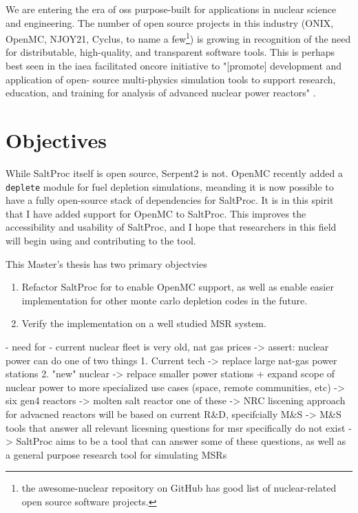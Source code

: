     We are entering the era of \Gls{oss} purpose-built for applications in nuclear science and engineering. The number of open source projects in this industry (ONIX\cite{de_troullioud_de_lanversin_onix_2021}, OpenMC, NJOY21\cite{noauthor_njoy21_2022}, Cyclus\cite{noauthor_cyclus_2022}, to name a few\footnote{the awesome-nuclear repository on GitHub \cite{romano_awesome_2022} has good list of nuclear-related open source software projects.}) is growing in recognition of the need for distributable, high-quality, and transparent software tools. This is perhaps best seen in the \Gls{iaea} facilitated \Gls{oncore} initiative \cite{fiorina_initiative_2021} to "[promote] development and application of open- source multi-physics simulation tools to support research, education, and training for analysis of advanced nuclear power reactors"  \cite{iaea_open-source_2022}. 


\section{Objectives}%
\label{sec:objectives}

While SaltProc itself is open source, Serpent2 is not. OpenMC recently added a \verb.deplete. module for fuel depletion simulations, meanding it is now possible to have a fully open-source stack of dependencies for SaltProc.  It is in this spirit that I have added support for OpenMC to SaltProc. This improves the accessibility and usability of SaltProc, and I hope that researchers in this field will begin using and contributing to the tool.

This Master's thesis has two primary objectvies
\begin{enumerate}
    \item Refactor SaltProc for to enable OpenMC support, as well as enable easier implementation for other monte carlo depletion codes in the future. 
    \item Verify the implementation on a well studied MSR system.
\end{enumerate}

- need for 
- current nuclear fleet is very old, nat gas prices
 -> assert: nuclear power can do one of two things
    1. Current tech -> replace large nat-gas power stations 
    2. "new" nuclear -> relpace smaller power stations + expand scope
        of nuclear power to more specialized use cases (space, remote communities, etc)
-> six gen4 reactors -> molten salt reactor one of these
-> NRC liscening approach for advacned reactors will be based on current R\&D, specifcially M\&S
-> M\&S tools that answer all relevant licesning questions for msr specifically do not exist
-> SaltProc aims to be a tool that can answer some of these questions, as well as a general purpose
    research tool for simulating MSRs
